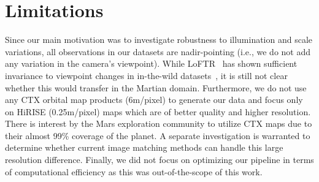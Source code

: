 \section{Limitations}
\label{sec:limitations}
Since our main motivation was to investigate robustness to illumination and scale variations, all observations in our datasets are nadir-pointing (i.e., we do not add any variation in the camera's viewpoint). While LoFTR~\cite{loftr} has shown sufficient invariance to viewpoint changes in in-the-wild datasets~\cite{megadepth}, it is still not clear whether this would transfer in the Martian domain.
Furthermore, we do not use any CTX orbital map products (6m/pixel) to generate our data and focus only on HiRISE (0.25m/pixel) maps which are of better quality and higher resolution. There is interest by the Mars exploration community to utilize CTX maps due to their almost 99\% coverage of the planet. A separate investigation is warranted to determine whether current image matching methods can handle this large resolution difference. 
Finally, we did not focus on optimizing our pipeline in terms of computational efficiency as this was out-of-the-scope of this work.

